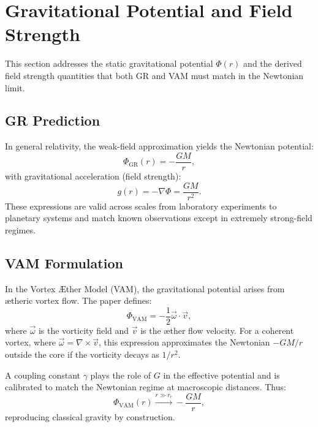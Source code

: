 \section{Gravitational Potential and Field Strength}

This section addresses the static gravitational potential $\Phi(r)$ and the derived field strength quantities that both GR and VAM must match in the Newtonian limit.

\subsection{GR Prediction}
In general relativity, the weak-field approximation yields the Newtonian potential:
\begin{equation}
    \Phi_\text{GR}(r) = -\frac{GM}{r},
\end{equation}
with gravitational acceleration (field strength):
\begin{equation}
    g(r) = -\nabla \Phi = \frac{GM}{r^2}.
\end{equation}
These expressions are valid across scales from laboratory experiments to planetary systems and match known observations except in extremely strong-field regimes.

\subsection{VAM Formulation}
In the Vortex Æther Model (VAM), the gravitational potential arises from ætheric vortex flow. The paper defines:
\begin{equation}
    \Phi_\text{VAM} = -\frac{1}{2} \vec{\omega} \cdot \vec{v},
\end{equation}
where $\vec{\omega}$ is the vorticity field and $\vec{v}$ is the æther flow velocity. For a coherent vortex, where $\vec{\omega} = \nabla \times \vec{v}$, this expression approximates the Newtonian $-GM/r$ outside the core if the vorticity decays as $1/r^2$.

A coupling constant $\gamma$ plays the role of $G$ in the effective potential and is calibrated to match the Newtonian regime at macroscopic distances. Thus:
\begin{equation}
    \Phi_\text{VAM}(r) \xrightarrow{r \gg r_c} -\frac{GM}{r},
\end{equation}
reproducing classical gravity by construction.

